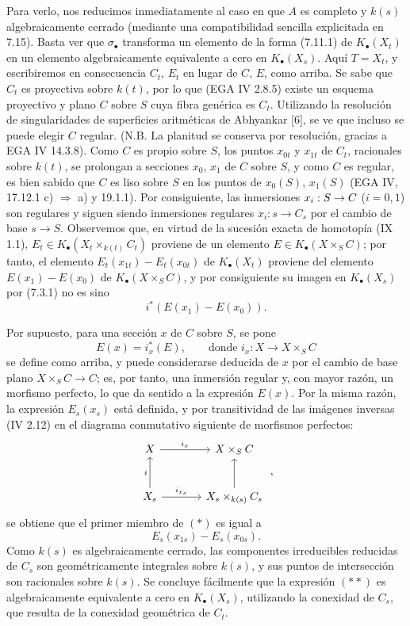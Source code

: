 Para verlo, nos reducimos inmediatamente al caso en que \(A\) es completo y \(k(s)\) algebraicamente cerrado (mediante una compatibilidad sencilla explicitada en 7.15). Basta ver que \(\sigma_\bullet\) transforma un elemento de la forma (7.11.1) de \(K_\bullet(X_t)\) en un elemento algebraicamente equivalente a cero en \(K_\bullet(X_s)\). Aquí \(T=X_t\), y escribiremos en consecuencia \(C_t\), \(E_t\) en lugar de \(C\), \(E\), como arriba. Se sabe que \(C_t\) es proyectiva sobre \(k(t)\), por lo que (EGA IV 2.8.5) existe un esquema proyectivo y plano \(C\) sobre \(S\) cuya fibra genérica es \(C_t\). Utilizando la resolución de singularidades de superficies aritméticas de Abhyankar [6], se ve que incluso se puede elegir \(C\) regular. (N.B. La planitud se conserva por resolución, gracias a EGA IV 14.3.8). Como \(C\) es propio sobre \(S\), los puntos \(x_{0t}\) y \(x_{1t}\) de \(C_t\), racionales sobre \(k(t)\), se prolongan a secciones \(x_0\), \(x_1\) de \(C\) sobre \(S\), y como \(C\) es regular, es bien sabido que \(C\) es liso sobre \(S\) en los puntos de \(x_0(S)\), \(x_1(S)\) (EGA IV, 17.12.1 c) \(\Rightarrow\) a) y 19.1.1). Por consiguiente, las inmersiones \(x_i:S\to \sisi{X}{C}\) (\(i=0,1\)) son regulares y siguen siendo inmersiones regulares \(x_i:s\to C_s\) por el cambio de base \(s\to S\). Observemos que, en virtud de la sucesión exacta de homotopía (IX 1.1), \(E_t\in K_\bullet(X_t\times_{k(t)}C_t)\) proviene de un elemento \(E\in K_\bullet(X\times_SC)\); por tanto, el elemento \(E_t(x_{1t})-E_t(x_{0t})\) de \(K_\bullet(X_t)\) proviene del elemento \(E(x_1)-E(x_0)\) de \(K_\bullet(X\times_SC)\), y por consiguiente su imagen en \(K_\bullet(X_s)\) por (7.3.1) no es sino %
\[
  i^*(E(x_1)-E(x_0)).
  \tag{*}
\]

Por supuesto, para una sección \(x\) de \(C\) sobre \(S\), se pone
\[
  E(x)=i_x^*(E),\qquad\text{donde } i_x:X\longrightarrow X\times_SC
\]
se define como arriba, y puede considerarse deducida de \(x\) por el cambio de base plano \(X\times_SC\to C\); es, por tanto, una inmersión regular y, con mayor razón, un morfismo perfecto, lo que da sentido a la expresión \(E(x)\). Por la misma razón, la expresión \(E_s(x_s)\) está definida, y por transitividad de las imágenes inversas (IV 2.12) en el diagrama conmutativo siguiente de morfismos perfectos:
\[
\begin{tikzcd}[column sep=large,row sep=large]
X \arrow[r,"i_x"] & X\times_SC\\
X_s \arrow[u,"i"] \arrow[r,"i_{x_s}"] & X_s\times_{k(\sisi{x}{s})}C_s \arrow[u] %
\end{tikzcd}
\;,
\]
se obtiene que el primer miembro de \((*)\) es igual a
\[
  E_s(x_{1s})-E_s(x_{0s}).
  \tag{**}
\]
Como \(k(s)\) es algebraicamente cerrado, las componentes irreducibles reducidas de \(C_s\) son geométricamente integrales sobre \(k(s)\), y sus puntos de intersección son racionales sobre \(k(s)\). Se concluye fácilmente que la expresión \((**)\) es algebraicamente equivalente a cero en \(K_\bullet(X_s)\), utilizando la conexidad de \(C_s\), que resulta de la conexidad geométrica de \(C_t\).

